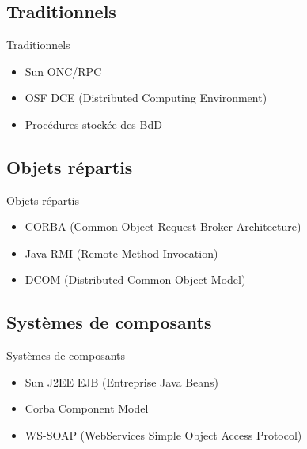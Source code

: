 \section{\sectitle}
\begin{frame}{\sectitle}
    \def\subsectitle{Traditionnels}
    \subsection{\subsectitle}
    \begin{block}{\subsectitle}
        \begin{itemize}
            \item Sun ONC/RPC
            \item OSF DCE (Distributed Computing Environment)
            \item Procédures stockée des BdD
        \end{itemize}
    \end{block}
    \def\subsectitle{Objets répartis}
    \subsection{\subsectitle}
    \begin{block}{\subsectitle}
        \begin{itemize}
            \item CORBA (Common Object Request Broker Architecture)
            \item Java RMI (Remote Method Invocation)
            \item DCOM (Distributed Common Object Model)
        \end{itemize}
    \end{block}
\end{frame}

\begin{frame}{\sectitle}
    \def\subsectitle{Systèmes de composants}
    \subsection{\subsectitle}
    \begin{block}{\subsectitle}
        \begin{itemize}
            \item Sun  J2EE EJB (Entreprise Java Beans)
            \item Corba Component Model
            \item WS-SOAP (WebServices Simple Object Access Protocol)
        \end{itemize}
    \end{block}
\end{frame}

